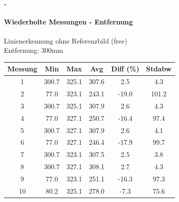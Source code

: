 \documentclass[xcolor=dvipsnames]{beamer}
\def\frametitlesec{\frametitle{\arabic{section}.\hspace{0.5ex}\insertsection}}
\def\framesubtitles#1{\framesubtitle{\hspace{3.5ex}#1}}
\begin{document}
\begin{frame}
	\frametitlesec
	\framesubtitles{Wiederholte Messungen - Entfernung}

	Linienerkennung ohne Referenzbild (free)\\
	Entfernung: 300mm
	\vfill

	\begin{tabular}{c|c|c|c|c|c}
		Messung & Min & Max & Avg & Diff (\%) & Stdabw \\ \hline
		1 & 300.7 & 325.1 & 307.6 & 2.5 & 4.3\\
		2 & 77.0 & 323.1 & 243.1 & -19.0 & 101.2\\
		3 & 300.7 & 325.1 & 307.9 & 2.6 & 4.3\\
		4 & 77.0 & 327.1 & 250.7 & -16.4 & 97.4\\
		5 & 300.7 & 327.1 & 307.9 & 2.6 & 4.1\\
		6 & 77.0 & 327.1 & 246.4 & -17.9 & 99.7\\
		7 & 300.7 & 323.1 & 307.5 & 2.5 & 3.8\\
		8 & 300.7 & 327.1 & 308.1 & 2.7 & 4.3\\
		9 & 77.0 & 323.1 & 251.1 & -16.3 & 97.3\\
		10 & 80.2 & 325.1 & 278.0 & -7.3 & 75.6
	\end{tabular}

\end{frame}
\end{document}
